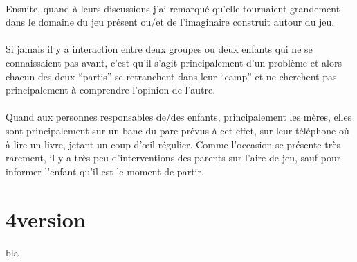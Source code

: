 \paragraph{} Ensuite, quand à leurs discussions j'ai remarqué qu'elle
tournaient grandement dans le domaine du jeu présent ou/et de l'imaginaire
construit autour du jeu.

\paragraph{} Si jamais il y a interaction entre deux groupes ou deux enfants
qui ne se connaissaient pas avant, c'est qu'il s'agit principalement d'un
problème et alors chacun des deux ``partis'' se retranchent dans leur ``camp''
et ne cherchent pas principalement à comprendre l'opinion de l'autre.

\paragraph{} Quand aux personnes responsables de/des enfants, principalement
les mères, elles sont principalement sur un banc du parc prévus à cet effet,
sur leur téléphone où à lire un livre, jetant un coup d'œil régulier. Comme
l'occasion se présente très rarement, il y a très peu d'interventions des
parents sur l'aire de jeu, sauf pour informer l'enfant qu'il est le moment de
partir.

\section{4\ieme version}

\paragraph{}
bla
